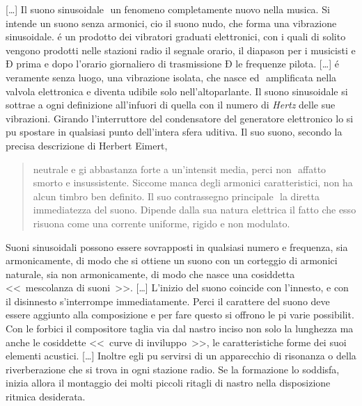 
%
%
[\ldots] Il suono sinusoidale  un fenomeno completamente nuovo nella musica. Si intende un suono senza armonici, cio il suono nudo, che forma una vibrazione sinusoidale. é un prodotto dei vibratori graduati elettronici, con i quali di solito vengono prodotti nelle stazioni radio il segnale orario, il diapason per i musicisti e Ð prima e dopo l'orario giornaliero di trasmissione Ð le frequenze pilota. [\ldots] é veramente senza luogo, una vibrazione isolata, che nasce ed  amplificata nella valvola elettronica e diventa udibile solo nell'altoparlante. Il suono sinusoidale si sottrae a  ogni definizione all'infuori di quella con il numero di \emph{Hertz} delle sue vibrazioni. Girando l'interruttore del condensatore del generatore elettronico lo si pu spostare in qualsiasi punto dell'intera sfera uditiva. Il suo suono, secondo la precisa descrizione di Herbert Eimert, 
\begin{quotation}
\begin{sf}
\begin{small}
\noindent neutrale e gi abbastanza forte a un'intensit media, perci non  affatto smorto e insussistente. Siccome manca degli armonici caratteristici, non ha alcun timbro ben definito. Il suo contrassegno principale  la diretta immediatezza del suono. Dipende dalla sua natura elettrica il fatto che esso risuona come una corrente uniforme, rigido e non modulato.
\end{small}
\end{sf} 
\end{quotation}

\noindent [\ldots] Suoni sinusoidali possono essere sovrapposti in qualsiasi numero e frequenza, sia armonicamente, di modo che si ottiene un suono con un corteggio di armonici naturale, sia non armonicamente, di modo che nasce una cosiddetta <<~mescolanza di suoni~>>. [\ldots] L'inizio del suono coincide con l'innesto, e con il disinnesto s'interrompe immediatamente. Perci il carattere del suono deve essere aggiunto alla composizione e per fare questo si offrono le pi varie possibilit. Con le forbici il compositore taglia via dal nastro inciso non solo la lunghezza ma anche le cosiddette <<~curve di inviluppo~>>, le caratteristiche forme dei suoi elementi acustici. [\ldots] Inoltre egli pu servirsi di un apparecchio di risonanza o della riverberazione che si trova in ogni stazione radio. Se la formazione lo soddisfa, inizia allora il montaggio dei molti piccoli ritagli di nastro nella disposizione ritmica desiderata.

